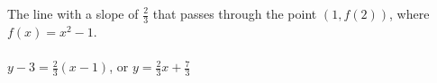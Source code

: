 {The line with a slope of $\frac{2}{3}$ that passes through the point $(1,f(2))$, where $f(x)=x^2-1$.}
{\text{}\\ \label{fig:01_05_ex_15}\\
$y-3 = \frac{2}{3} (x-1)$, or $y=\frac{2}{3} x + \frac{7}{3}$ }
